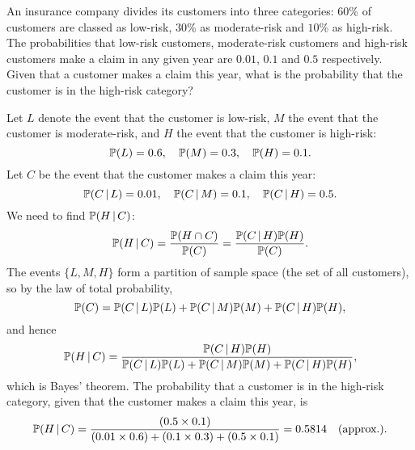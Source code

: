 \begin{exercise}
\begin{questions}

\question
An insurance company divides its customers into three categories: $60$\% of customers are classed as low-risk, $30$\% as moderate-risk and $10$\% as high-risk. The probabilities that low-risk customers, moderate-risk customers and high-risk customers make a claim in any given year are $0.01$, $0.1$ and $0.5$ respectively. Given that a customer makes a claim this year, what is the probability that the customer is in the high-risk category?

\begin{answer}
Let $L$ denote the event that the customer is low-risk, $M$ the event that the customer is moderate-risk, and $H$ the event that the customer is high-risk:
\[
\mathbb{P}(L) = 0.6,\quad \mathbb{P}(M) = 0.3,\quad \mathbb{P}(H) = 0.1.
\]
Let $C$ be the event that the customer makes a claim this year:
\[
\mathbb{P}(C\,|\,L) = 0.01,\quad \mathbb{P}(C\,|\,M) = 0.1,\quad \mathbb{P}(C\,|\,H) = 0.5.
\]
We need to find $\mathbb{P}(H\,|\,C)$:
\[
\mathbb{P}(H\,|\,C) = \frac{\mathbb{P}(H\cap C)}{\mathbb{P}(C)} = \frac{\mathbb{P}(C\,|\,H)\mathbb{P}(H)}{\mathbb{P}(C)}.
\]
The events $\{L,M,H\}$ form a partition of sample space (the set of all customers), so by the law of total probability,
\[
\mathbb{P}(C) = \mathbb{P}(C\,|\,L)\mathbb{P}(L) + \mathbb{P}(C\,|\,M)\mathbb{P}(M) + \mathbb{P}(C\,|\,H)\mathbb{P}(H),
\]
and hence
\[
\mathbb{P}(H\,|\,C) = \frac{\mathbb{P}(C\,|\,H)\mathbb{P}(H)}{\mathbb{P}(C\,|\,L)\mathbb{P}(L) + \mathbb{P}(C\,|\,M)\mathbb{P}(M) + \mathbb{P}(C\,|\,H)\mathbb{P}(H)},
\]
which is Bayes' theorem. The probability that a customer is in the high-risk category, given that the customer makes a claim this year, is 
\[
\mathbb{P}(H\,|\,C) 
	= \frac{(0.5\times 0.1)}{(0.01\times 0.6) + (0.1\times 0.3) + (0.5\times 0.1)}
	= 0.5814\quad\text{(approx.).}
\]
\end{answer}


\end{questions}
\end{exercise}
